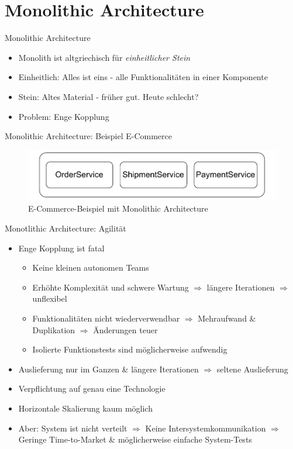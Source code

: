 \section{Monolithic Architecture}

\begin{frame}{Monolithic Architecture}
    \begin{itemize}
        \item Monolith ist altgriechisch für \textit{einheitlicher Stein}
        \item Einheitlich: Alles ist eins - alle Funktionalitäten in einer Komponente
        \item Stein: Altes Material - früher gut. Heute schlecht?
        \item Problem: Enge Kopplung
    \end{itemize}
\end{frame}

\begin{frame}{Monolithic Architecture: Beispiel E-Commerce}
    \begin{figure}[!h]
        \centering
        \includegraphics[scale=0.70]{imglib/mono/mono}
        \caption{E-Commerce-Beispiel mit Monolithic Architecture}
        \label{fig:mono-ecommerce}
    \end{figure}
\end{frame}

\begin{frame}{Monotlithic Architecture: Agilität}
    \begin{itemize}
        \item Enge Kopplung ist fatal
        \begin{itemize}
            \item Keine kleinen autonomen Teams
            \item Erhöhte Komplexität und schwere Wartung $\Rightarrow$ längere Iterationen $\Rightarrow$ unflexibel
            \item Funktionalitäten nicht wiederverwendbar $\Rightarrow$ Mehraufwand \& Duplikation $\Rightarrow$ Änderungen teuer
            \item Isolierte Funktionstests sind möglicherweise aufwendig
        \end{itemize}
        \item Auslieferung nur im Ganzen \& längere Iterationen $\Rightarrow$ seltene Auslieferung
        \item Verpflichtung auf genau eine Technologie
        \item Horizontale Skalierung kaum möglich
        \item Aber: System ist nicht verteilt $\Rightarrow$ Keine Intersystemkommunikation $\Rightarrow$ Geringe Time-to-Market \& möglicherweise einfache System-Tests
    \end{itemize}
\end{frame}